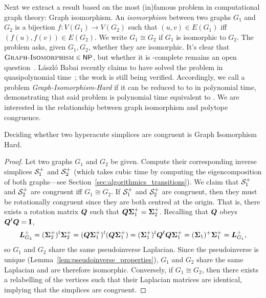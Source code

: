 Next we extract a result based on the most (in)famous problem in computational graph theory: Graph isomorphism. An \emph{isomorphism} between two graphs $G_1$ and $G_2$ is a bijection $f:V(G_1)\to V(G_2)$ such that $(u,v)\in E(G_1)$ iff $(f(u),f(v))\in E(G_2)$. We write $G_1\cong G_2$ if $G_1$ is isomorphic to $G_2$. The \graphiso problem asks, given $G_1,G_2$, whether they are isomorphic. 
It's clear that $\textsc{Graph-Isomorphism}\in{\normalfont\textsf{NP}}$, but whether it is \NP-complete remains an open question~\cite{mckay2014practical}. L{\'a}szl{\'o} Babai recently claims to have solved the problem in  quasipolynomial time~\cite{babai2016graph}; the work is still being verified. 
Accordingly, we call a problem \emph{Graph-Isomorphism-Hard} if it can be reduced to to \graphiso in polynomial  time, demonstrating that said problem is  polynomial time equivalent to \graphiso.  
We are interested in the relationship between graph isomorphism and polytope congruence.  

\begin{theorem}
\label{thm:simplex_congruence}
Deciding whether two hyperacute simplices are congruent is Graph Isomorphism Hard. 
\end{theorem}
\begin{proof}
	Let two graphs $G_1$ and $G_2$ be given. Compute their corresponding inverse simplices $\mathcal{S}_1^+$ and $\mathcal{S}_2^+$ (which  takes cubic time  by  computing  the eigencomposition of both graphs---see Section~\ref{sec:algorithmics_transitions}). 
	We claim that $\mathcal{S}_1^+$ and $\mathcal{S}_2^+$ are congruent iff $G_1\cong G_2$. If $\mathcal{S}_1^+$ and $\mathcal{S}_2^+$ are congruent, then they must be rotationally congruent since they are both centred at the origin. That is, there exists a rotation matrix $\vb*{Q}$ such that $\vb*{Q}\boldsymbol{\Sigma}_1^+=\boldsymbol{\Sigma}_2^+$. 
	Recalling that $\vb*{Q}$ obeys $\vb*{Q}^t\vb*{Q}=\vb{I}$, 
	\begin{equation*}
	\vb*{L}_{G_2}^+=(\boldsymbol{\Sigma}_2^+)^t\boldsymbol{\Sigma}_2^+ =  (\vb*{Q}\boldsymbol{\Sigma}_1^+)^t (\vb*{Q}\boldsymbol{\Sigma}_1^+) = (\boldsymbol{\Sigma}_1^+)^t \vb*{Q}^t \vb*{Q}\boldsymbol{\Sigma}_1^+  = (\boldsymbol{\Sigma}_1)^+ \boldsymbol{\Sigma}_1^+ = \vb*{L}_{G_1}^+,
	\end{equation*}
	so $G_1$ and $G_2$ share the same pseudoinverse Laplacian. Since the pseudoinverse is unique (Lemma~\ref{lem:pseudoinverse_properties}), $G_1$ and $G_2$ share the same Laplacian and are therefore isomorphic.  
	Conversely, if $G_1\cong G_2$, then there exists a  relabelling of the vertices such that their Laplacian matrices are identical, implying that the simplices  are  congruent. 
\end{proof}

